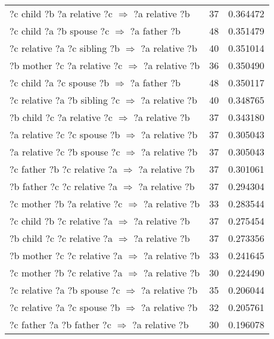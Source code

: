 \begin{longtable}{lrr}
   ?c  child  ?b  ?a  relative  ?c   $\Rightarrow$ ?a  relative  ?b &           37 &        0.364472 \\
       ?c  child  ?a  ?b  spouse  ?c   $\Rightarrow$ ?a  father  ?b &           48 &        0.351479 \\
 ?c  relative  ?a  ?c  sibling  ?b   $\Rightarrow$ ?a  relative  ?b &           40 &        0.351014 \\
  ?b  mother  ?c  ?a  relative  ?c   $\Rightarrow$ ?a  relative  ?b &           36 &        0.350490 \\
       ?c  child  ?a  ?c  spouse  ?b   $\Rightarrow$ ?a  father  ?b &           48 &        0.350117 \\
 ?c  relative  ?a  ?b  sibling  ?c   $\Rightarrow$ ?a  relative  ?b &           40 &        0.348765 \\
   ?b  child  ?c  ?a  relative  ?c   $\Rightarrow$ ?a  relative  ?b &           37 &        0.343180 \\
  ?a  relative  ?c  ?c  spouse  ?b   $\Rightarrow$ ?a  relative  ?b &           37 &        0.305043 \\
  ?a  relative  ?c  ?b  spouse  ?c   $\Rightarrow$ ?a  relative  ?b &           37 &        0.305043 \\
  ?c  father  ?b  ?c  relative  ?a   $\Rightarrow$ ?a  relative  ?b &           37 &        0.301061 \\
  ?b  father  ?c  ?c  relative  ?a   $\Rightarrow$ ?a  relative  ?b &           37 &        0.294304 \\
  ?c  mother  ?b  ?a  relative  ?c   $\Rightarrow$ ?a  relative  ?b &           33 &        0.283544 \\
   ?c  child  ?b  ?c  relative  ?a   $\Rightarrow$ ?a  relative  ?b &           37 &        0.275454 \\
   ?b  child  ?c  ?c  relative  ?a   $\Rightarrow$ ?a  relative  ?b &           37 &        0.273356 \\
  ?b  mother  ?c  ?c  relative  ?a   $\Rightarrow$ ?a  relative  ?b &           33 &        0.241645 \\
  ?c  mother  ?b  ?c  relative  ?a   $\Rightarrow$ ?a  relative  ?b &           30 &        0.224490 \\
  ?c  relative  ?a  ?b  spouse  ?c   $\Rightarrow$ ?a  relative  ?b &           35 &        0.206044 \\
  ?c  relative  ?a  ?c  spouse  ?b   $\Rightarrow$ ?a  relative  ?b &           32 &        0.205761 \\
    ?c  father  ?a  ?b  father  ?c   $\Rightarrow$ ?a  relative  ?b &           30 &        0.196078 \\

\end{longtable}
